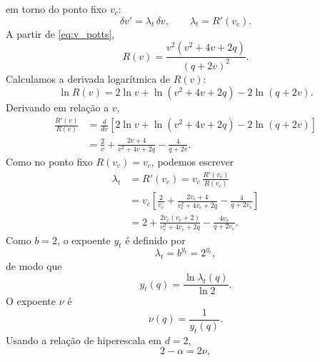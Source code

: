 \documentclass[12pt,a4paper]{article}
\begin{document}
%
em torno do ponto fixo \(v_c\):
%
\begin{equation}
    \delta v'
    =
    \lambda_t\,\delta v,
    \qquad
    \lambda_t=R'(v_c).
    \label{eq:linearization_potts}
\end{equation}
%
A partir de \eqref{eq:v_potts},
%
\begin{equation}
    R(v)
    =
    \frac{
        v^2(v^2+4v+2q)
    }{(q+2v)^2}.
    \label{eq:Rv_potts}
\end{equation}
%
Calculamos a derivada logarítmica de \(R(v)\):
%
\begin{equation}
    \ln R(v)
    =
    2\ln v
    +
    \ln(v^2+4v+2q)
    -
    2\ln(q+2v).
    \label{eq:lnR_potts}
\end{equation}
%
Derivando em relação a \(v\),
%
\begin{align}
    \frac{R'(v)}{R(v)}
    &=
    \frac{d}{dv}
    \left[
        2\ln v
        +
        \ln(v^2+4v+2q)
        -
        2\ln(q+2v)
    \right]
    \nonumber\\[4pt]
    &=
    \frac{2}{v}
    +
    \frac{2v+4}{v^2+4v+2q}
    -
    \frac{4}{q+2v}.
    \label{eq:logderiv_potts}
\end{align}
%
Como no ponto fixo \(R(v_c)=v_c\), podemos escrever
%
\begin{align}
    \lambda_t
    &=
    R'(v_c)
    =
    v_c\,
    \frac{R'(v_c)}{R(v_c)}
    \nonumber\\[4pt]
    &=
    v_c
    \left[
        \frac{2}{v_c}
        +
        \frac{2v_c+4}{v_c^2+4v_c+2q}
        -
        \frac{4}{q+2v_c}
    \right]
    \nonumber\\[4pt]
    &=
    2
    +
    \frac{
        2v_c(v_c+2)
    }{
        v_c^2+4v_c+2q
    }
    -
    \frac{
        4v_c
    }{
        q+2v_c
    }.
    \label{eq:lambdat_potts}
\end{align}
%
Como \(b=2\), o expoente \(y_t\) é definido por
%
\begin{equation}
    \lambda_t=b^{y_t}=2^{y_t},
\end{equation}
%
de modo que
%
\begin{equation}
    y_t(q)
    =
    \frac{\ln\lambda_t(q)}{\ln 2}.
    \label{eq:yt_potts}
\end{equation}
%
O expoente \(\nu\) é
%
\begin{equation}
    \nu(q)=\frac{1}{y_t(q)}.
    \label{eq:nu_potts}
\end{equation}
%
Usando a relação de hiperescala em \(d=2\),
%
\begin{equation}
    2-\alpha=2\nu,
\end{equation}
\end{document}
